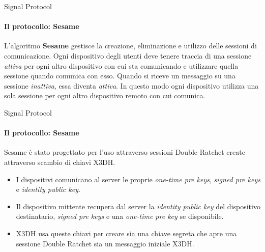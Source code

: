 \begin{frame}{Signal Protocol}
    \framesubtitle{Il protocollo: Sesame}

    L'algoritmo \textbf{Sesame} gestisce la creazione, eliminazione e utilizzo delle sessioni di comunicazione.\newline\pause
    Ogni dispositivo degli utenti deve tenere traccia di una sessione \textit{attiva} per ogni altro dispositivo con cui sta comunicando e utilizzare quella sessione quando comunica con esso.
    Quando si riceve un messaggio su una sessione \textit{inattiva}, essa diventa \textit{attiva}.\pause\newline
    In questo modo ogni dispositivo utilizza una sola sessione per ogni altro dispositivo remoto con cui comunica. 
    \cite{sesame}

\end{frame}

\begin{frame}{Signal Protocol}
    \framesubtitle{Il protocollo: Sesame}
    Sesame è stato progettato per l'uso attraverso sessioni Double Ratchet create attraverso scambio di chiavi X3DH.

    \begin{itemize}
        \item I dispositivi comunicano al server le proprie \textit{one-time pre keys}, \textit{signed pre keys} e \textit{identity public key}.\pause
        \item Il dispositivo mittente recupera dal server la \textit{identity public key} del dispositivo destinatario, \textit{signed pre keys} e una \textit{one-time pre key} se disponibile.\pause
        \item X3DH usa queste chiavi per creare sia una chiave segreta che apre una sessione Double Ratchet sia un messaggio iniziale X3DH.
    \end{itemize}    

\end{frame}

